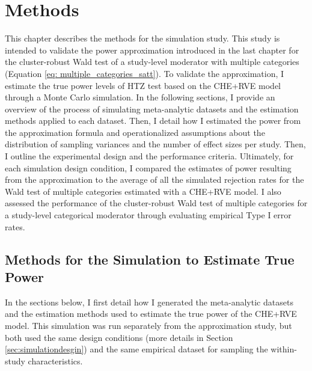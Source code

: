 \chapter{Methods}\label{ch: methods}


This chapter describes the methods for the simulation study. This study is intended to validate the power approximation introduced in the last chapter for the cluster-robust Wald test of a study-level moderator with multiple categories (Equation \ref{eq: multiple_categories_satt}). To validate the approximation, I estimate the true power levels of HTZ test based on the CHE+RVE model through a Monte Carlo simulation. In the following sections, I provide an overview of the process of simulating meta-analytic datasets and the estimation methods applied to each dataset. Then, I detail how I estimated the power from the approximation formula and operationalized assumptions about the distribution of sampling variances and the number of effect sizes per study. Then, I outline the experimental design and the performance criteria. Ultimately, for each simulation design condition, I compared the estimates of power resulting from the approximation to the average of all the simulated rejection rates for the Wald test of multiple categories estimated with a CHE+RVE model. I also assessed the performance of the cluster-robust Wald test of multiple categories for a study-level categorical moderator through evaluating empirical Type I error rates.   


\section{Methods for the Simulation to Estimate True Power}

In the sections below, I first detail how I generated the meta-analytic datasets and the estimation methods used to estimate the true power of the CHE+RVE model. This simulation was run separately from the approximation study, but both used the same design conditions (more details in Section \ref{sec:simulationdesgin}) and the same empirical dataset for sampling the within-study characteristics. 

